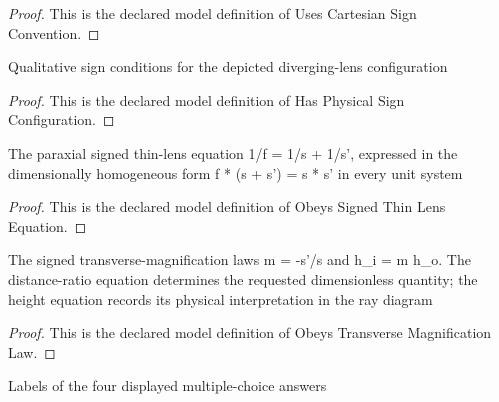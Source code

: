 \begin{proof}
  This is the declared model definition of Uses Cartesian Sign Convention.
\end{proof}
\begin{definition}
  \label{def:physics:phyx-mini-0053:phyxminiproblems-problemphyxmini0053-hasphysicalsignconfiguration}
  Qualitative sign conditions for the depicted diverging-lens configuration
\end{definition}
\begin{proof}
  This is the declared model definition of Has Physical Sign Configuration.
\end{proof}
\begin{definition}
  \label{def:physics:phyx-mini-0053:phyxminiproblems-problemphyxmini0053-obeyssignedthinlensequation}
  The paraxial signed thin-lens equation 1/f = 1/s + 1/s', expressed in the dimensionally homogeneous form f * (s + s') = s * s' in every unit system
\end{definition}
\begin{proof}
  This is the declared model definition of Obeys Signed Thin Lens Equation.
\end{proof}
\begin{definition}
  \label{def:physics:phyx-mini-0053:phyxminiproblems-problemphyxmini0053-obeystransversemagnificationlaw}
  The signed transverse-magnification laws m = -s'/s and h\_i = m h\_o. The distance-ratio equation determines the requested dimensionless quantity; the height equation records its physical interpretation in the ray diagram
\end{definition}
\begin{proof}
  This is the declared model definition of Obeys Transverse Magnification Law.
\end{proof}
\begin{definition}
  \label{def:physics:phyx-mini-0053:phyxminiproblems-problemphyxmini0053-answerchoice}
  Labels of the four displayed multiple-choice answers
\end{definition}
